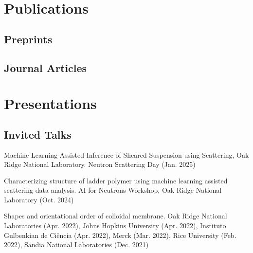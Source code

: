 \documentclass[11pt,letterpaper]{article}
\begin{document}
\section*{Publications}

%

\subsection*{Preprints}
\begin{etaremune}
    \item {}
    \item {}
    \item {}
    \item {}
    \item {}
\end{etaremune}

\subsection*{Journal Articles}
\begin{etaremune}
    \item {}
    \item {}
    \item {}
    \item {}
    \item {}
    \item {}
    \item {}
    \item {}
\end{etaremune}

\section*{Presentations}

\subsection*{Invited Talks}
\begin{etaremune}
    \item Machine Learning-Assisted Inference of Sheared Suspension using Scattering, Oak Ridge National Laboratory. Neutron Scattering Day (Jan. 2025)
    \item Characterizing structure of ladder polymer using machine learning assisted scattering data analysis. AI for Neutrons Workshop, Oak Ridge National Laboratory (Oct. 2024)
    \item Shapes and orientational order of colloidal membrane. Oak Ridge National Laboratories (Apr. 2022), Johns Hopkins University (Apr. 2022), Instituto Gulbenkian de Ciência (Apr. 2022), Merck (Mar. 2022), Rice University (Feb. 2022), Sandia National Laboratories (Dec. 2021)
\end{etaremune}
\end{document}
